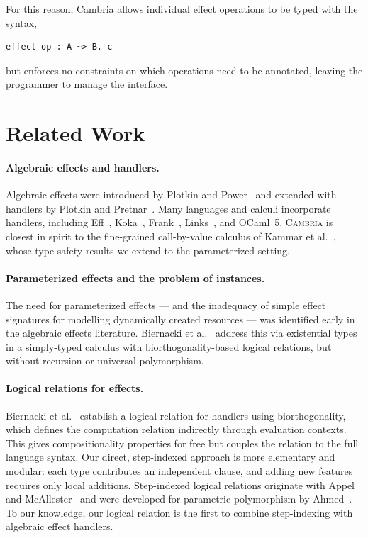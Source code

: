 \documentclass[acmsmall,screen,review,anonymous]{acmart}
\newcommand{\cambria}{\textsc{Cambria}}
\begin{document}
For this reason, Cambria allows individual effect operations to be typed with the syntax,
\begin{lstlisting}
effect op : A ~> B. c
\end{lstlisting}
but enforces no constraints on which operations need to be annotated, leaving the programmer to manage the interface.


\section{Related Work}\label{sec:related}

\paragraph{Algebraic effects and handlers.}
Algebraic effects were introduced by Plotkin and Power~\cite{plotkin_algebraic_2003} and extended with handlers by Plotkin and Pretnar~\cite{plotkin_handling_2009}. Many languages and calculi incorporate handlers, including Eff~\cite{bauer_programming_2015}, Koka~\cite{leijen_koka_2014}, Frank~\cite{lindley_do_2017}, Links~\cite{hillerström_continuation_2017}, and OCaml~5. \cambria{} is closest in spirit to the fine-grained call-by-value calculus of Kammar et al.~\cite{kammar_handlers_2013}, whose type safety results we extend to the parameterized setting.

\paragraph{Parameterized effects and the problem of instances.}
The need for parameterized effects --- and the inadequacy of simple effect signatures for modelling dynamically created resources --- was identified early in the algebraic effects literature. Biernacki et al.~\cite{biernacki2018handle} address this via existential types in a simply-typed calculus with biorthogonality-based logical relations, but without recursion or universal polymorphism.

\paragraph{Logical relations for effects.}
Biernacki et al.~\cite{biernacki2018handle} establish a logical relation for handlers using biorthogonality, which defines the computation relation indirectly through evaluation contexts. This gives compositionality properties for free but couples the relation to the full language syntax. Our direct, step-indexed approach is more elementary and modular: each type contributes an independent clause, and adding new features requires only local additions. Step-indexed logical relations originate with Appel and McAllester~\cite{appel_indexed_2001} and were developed for parametric polymorphism by Ahmed~\cite{ahmed_semantics_2006}. To our knowledge, our logical relation is the first to combine step-indexing with algebraic effect handlers.
\end{document}
